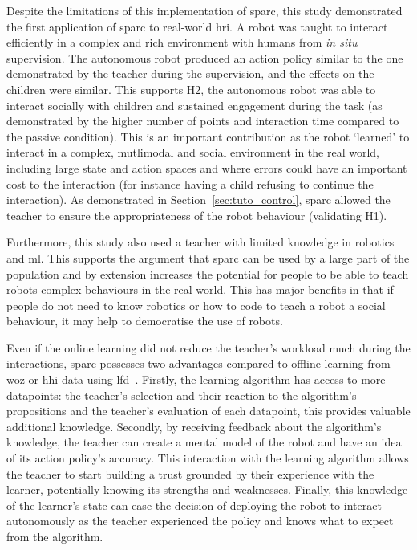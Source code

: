 Despite the limitations of this implementation of \gls{sparc}, this study demonstrated the first application of \gls{sparc} to real-world \gls{hri}. A robot was taught to interact efficiently in a complex and rich environment with humans from \textit{in situ} supervision. The autonomous robot produced an action policy similar to the one demonstrated by the teacher during the supervision, and the effects on the children were similar. This supports H2, the autonomous robot was able to interact socially with children and sustained engagement during the task (as demonstrated by the higher number of points and interaction time compared to the passive condition). This is an important contribution as the robot `learned' to interact in a complex, mutlimodal and social environment in the real world, including large state and action spaces and where errors could have an important cost to the interaction (for instance having a child refusing to continue the interaction). As demonstrated in Section~\ref{sec:tuto_control}, \gls{sparc} allowed the teacher to ensure the appropriateness of the robot behaviour (validating H1).

Furthermore, this study also used a teacher with limited knowledge in robotics and \gls{ml}. This supports the argument that \gls{sparc} can be used by a large part of the population and by extension increases the potential for people to be able to teach robots complex behaviours in the real-world. This has major benefits in that if people do not need to know robotics or how to code to teach a robot a social behaviour, it may help to democratise the use of robots. 

Even if the online learning did not reduce the teacher's workload much during the interactions, \gls{sparc} possesses two advantages compared to offline learning from \gls{woz} or \gls{hhi} data using \gls{lfd}~\citep{sequeira2016discovering,liu2014train}. Firstly, the learning algorithm has access to more datapoints: the teacher's selection and their reaction to the algorithm's propositions and the teacher's evaluation of each datapoint, this provides valuable additional knowledge. Secondly, by receiving feedback about the algorithm's knowledge, the teacher can create a mental model of the robot and have an idea of its action policy's accuracy. This interaction with the learning algorithm allows the teacher to start building a trust grounded by their experience with the learner, potentially knowing its strengths and weaknesses. Finally, this knowledge of the learner's state can ease the decision of deploying the robot to interact autonomously as the teacher experienced the policy and knows what to expect from the algorithm.


